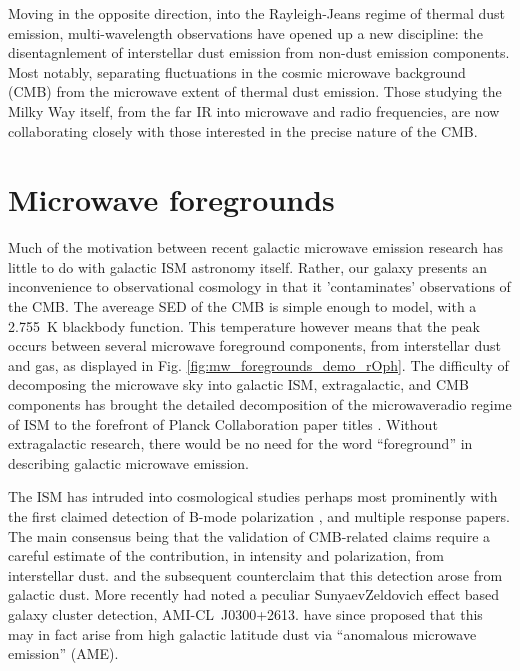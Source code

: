     Moving in the opposite direction, into the Rayleigh-Jeans regime of thermal dust emission, multi-wavelength observations have opened up a new discipline: the disentagnlement of interstellar dust emission from non-dust emission components. Most notably, separating fluctuations in the cosmic microwave background (CMB) from the microwave extent of thermal dust emission. Those studying the Milky Way itself, from the far IR into microwave and radio frequencies, are now collaborating closely with those interested in the precise nature of the CMB.

\section{Microwave foregrounds}

    Much of the motivation between recent galactic microwave emission research has little to do with galactic ISM astronomy itself. Rather, our galaxy presents an inconvenience to observational cosmology in that it 'contaminates' observations of the CMB. The avereage SED of the CMB is simple enough to model, with a 2.755~K blackbody function. This temperature however means that the peak occurs between several microwave foreground components, from interstellar dust and gas, as displayed in Fig. \ref{fig:mw_foregrounds_demo_rOph}. The difficulty of decomposing the microwave sky into galactic ISM, extragalactic, and CMB components has brought the detailed decomposition of the microwave\-radio regime of ISM to the forefront of Planck Collaboration paper titles \citep{planckEarly11I,planck2013I,planck2015I}. Without extragalactic research, there would be no need for the word ``foreground'' in describing galactic microwave emission.

    The ISM has intruded into cosmological studies perhaps most prominently with the first claimed detection of B-mode polarization \citep{hanson13, bicep214, flauger14}, and multiple response papers. The main consensus being that the validation of CMB-related claims require a careful estimate of the contribution, in intensity and polarization, from interstellar dust. and the subsequent counter\-claim that this detection arose from galactic dust\citep{planckIntL17, sheehy17}. More recently \cite{shimwell12} had noted a peculiar Sunyaev\-Zeldovich effect based galaxy cluster detection, AMI-CL~J0300+2613. \cite{perrott18} have since proposed that this may in fact arise from high galactic latitude dust via ``anomalous microwave emission'' (AME).

